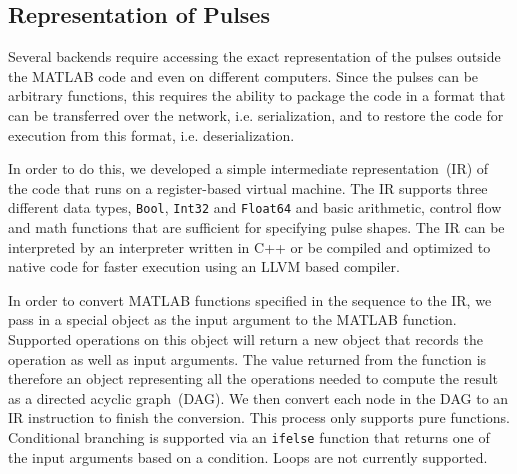 \subsection{Representation of Pulses}
\label{ch:computer-control:backend:pulse-repr}
Several backends require accessing the exact representation of the pulses
outside the MATLAB code and even on different computers.
Since the pulses can be arbitrary functions,
this requires the ability to package the code in a format
that can be transferred over the network, i.e. serialization,
and to restore the code for execution from this format, i.e. deserialization.

In order to do this, we developed a simple intermediate representation~(IR)
of the code that runs on a register-based virtual machine.
The IR supports three different data types, \lstinline{Bool},
\lstinline{Int32} and \lstinline{Float64}
and basic arithmetic, control flow and math functions
that are sufficient for specifying pulse shapes.
The IR can be interpreted by an interpreter written in C++ or
be compiled and optimized to native code for faster execution using an LLVM based compiler.

In order to convert MATLAB functions specified in the sequence to the IR,
we pass in a special object as the input argument to the MATLAB function.
Supported operations on this object will return a new object
that records the operation as well as input arguments.
The value returned from the function is therefore an object representing
all the operations needed to compute the result as a directed acyclic graph~(DAG).
We then convert each node in the DAG to an IR instruction to finish the conversion.
This process only supports pure functions.
Conditional branching is supported via an \lstinline{ifelse} function
that returns one of the input arguments based on a condition.
Loops are not currently supported.

